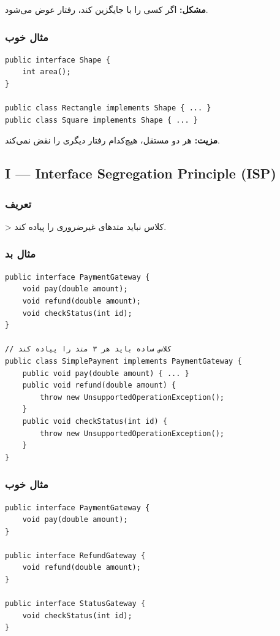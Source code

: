 \documentclass[12pt, a4paper]{article}
\begin{document}
\textbf{مشکل:} اگر کسی  را با  جایگزین کند، رفتار 
عوض می‌شود.

\subsubsection{مثال خوب}
\begin{lstlisting}
public interface Shape {
    int area();
}

public class Rectangle implements Shape { ... }
public class Square implements Shape { ... }
\end{lstlisting}

\textbf{مزیت:} هر دو مستقل، هیچ‌کدام رفتار دیگری را نقض نمی‌کند.

\subsection{I — Interface Segregation Principle (ISP)}

\subsubsection{تعریف}
> کلاس نباید متدهای غیرضروری را پیاده کند.

\subsubsection{مثال بد}
\begin{lstlisting}
public interface PaymentGateway {
    void pay(double amount);
    void refund(double amount);
    void checkStatus(int id);
}

// کلاس ساده باید هر ۳ متد را پیاده کند
public class SimplePayment implements PaymentGateway {
    public void pay(double amount) { ... }
    public void refund(double amount) { 
        throw new UnsupportedOperationException();
    }
    public void checkStatus(int id) { 
        throw new UnsupportedOperationException();
    }
}
\end{lstlisting}

\subsubsection{مثال خوب}
\begin{lstlisting}
public interface PaymentGateway {
    void pay(double amount);
}

public interface RefundGateway {
    void refund(double amount);
}

public interface StatusGateway {
    void checkStatus(int id);
}
\end{lstlisting}
\end{document}
